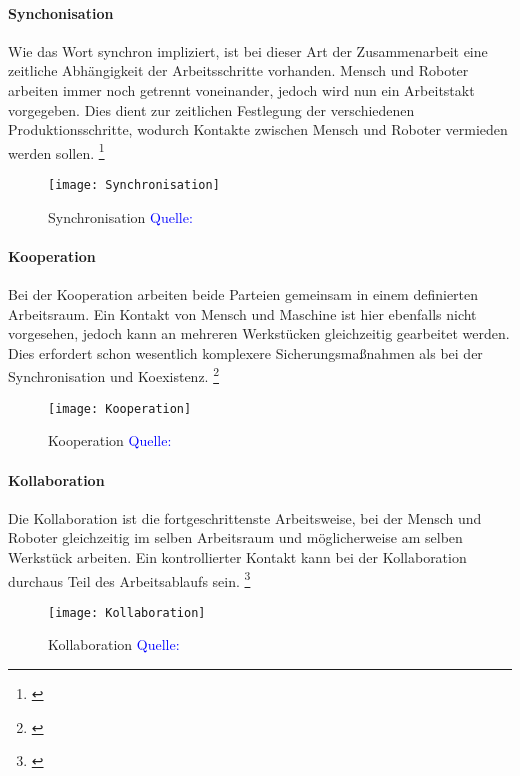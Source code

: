 \documentclass[titlepage,12pt,twoside]{article}
\begin{document}
\paragraph{Synchonisation}
\hfill \break
\hfill \break
Wie das Wort synchron impliziert, ist bei dieser Art der Zusammenarbeit eine 
zeitliche Abhängigkeit der Arbeitsschritte vorhanden. Mensch und Roboter arbeiten 
immer noch getrennt voneinander, jedoch wird nun ein Arbeitstakt vorgegeben. Dies 
dient zur zeitlichen Festlegung der verschiedenen Produktionsschritte, wodurch 
Kontakte zwischen Mensch und Roboter vermieden werden sollen. \footnote{\cite{rubigm.p11}}\\
\begin{figure}[H]
	\begin{center}
		\scalebox{0.4}
		{\texttt{[image: Synchronisation]}}
		\caption{Synchronisation \textcolor{blue}{Quelle: \cite{rubigm.p11}}}
		\label{fig:Synchronisation}
	\end{center}
\end{figure}
\hfill \break
\newpage
\paragraph{Kooperation}
\hfill \break
\hfill \break
Bei der Kooperation arbeiten beide Parteien gemeinsam in einem definierten 
Arbeitsraum. Ein Kontakt von Mensch und Maschine ist hier ebenfalls nicht 
vorgesehen, jedoch kann an mehreren Werkstücken gleichzeitig gearbeitet werden. 
Dies erfordert schon wesentlich komplexere Sicherungsmaßnahmen als bei der 
Synchronisation und Koexistenz. \footnote{\cite{rubigm.p11}}\\
\begin{figure}[H]
	\begin{center}
		\scalebox{0.4}
		{\texttt{[image: Kooperation]}}
		\caption{Kooperation \textcolor{blue}{Quelle: \cite{rubigm.p11}}}
		\label{fig:Kooperation}
	\end{center}
\end{figure}
\hfill \break
\newpage
\paragraph{Kollaboration}
\hfill \break
\hfill \break
Die Kollaboration ist die fortgeschrittenste Arbeitsweise, bei der Mensch und 
Roboter gleichzeitig im selben Arbeitsraum und möglicherweise am selben Werkstück 
arbeiten. Ein kontrollierter Kontakt kann bei der Kollaboration durchaus Teil des 
Arbeitsablaufs sein. \footnote{\cite{rubigm.p11}}\\
\begin{figure}[H]
	\begin{center}
		\scalebox{0.4}
		{\texttt{[image: Kollaboration]}}
		\caption{Kollaboration \textcolor{blue}{Quelle: \cite{rubigm.p11}}}
		\label{fig:Kollaboration}
	\end{center}
\end{figure}
\newpage
\end{document}
